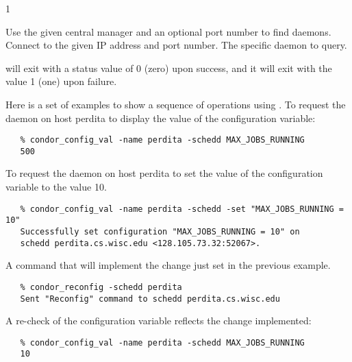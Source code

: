 \begin{ManPage}{\label{man-condor-config-val}}{1}
\begin{Options}
    { Use the given central manager and an optional port number
    to find daemons. }
    { Connect to the given IP address and port number. }
    {The specific daemon to query. }
\end{Options}

\ExitStatus

 will exit with a status value of 0 (zero) upon success,
and it will exit with the value 1 (one) upon failure.

\Examples

Here is a set of examples to show a sequence of operations using 
.
To request the  daemon on host perdita
to display the value of the  configuration variable:
\footnotesize
\begin{verbatim}
   % condor_config_val -name perdita -schedd MAX_JOBS_RUNNING
   500
\end{verbatim}
\normalsize

To request the  daemon on host perdita
to set the value of the  configuration variable
to the value 10.
\footnotesize
\begin{verbatim}
   % condor_config_val -name perdita -schedd -set "MAX_JOBS_RUNNING = 10"
   Successfully set configuration "MAX_JOBS_RUNNING = 10" on 
   schedd perdita.cs.wisc.edu <128.105.73.32:52067>.
\end{verbatim}
\normalsize

A command that will implement the change just set in the previous
example.
\footnotesize
\begin{verbatim}
   % condor_reconfig -schedd perdita
   Sent "Reconfig" command to schedd perdita.cs.wisc.edu
\end{verbatim}
\normalsize

A re-check of the configuration variable reflects the change implemented:
\footnotesize
\begin{verbatim}
   % condor_config_val -name perdita -schedd MAX_JOBS_RUNNING
   10
\end{verbatim}
\normalsize


\end{ManPage}
